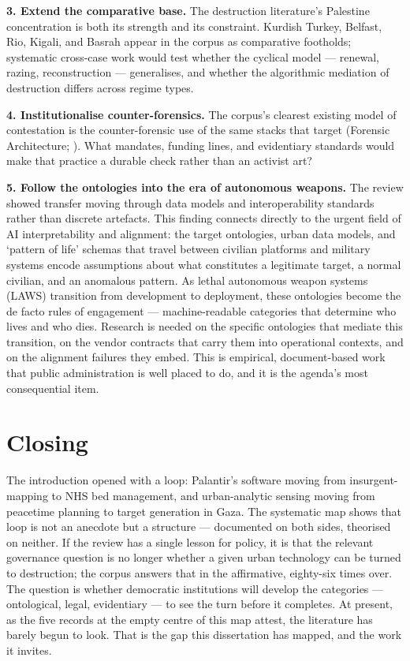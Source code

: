 \textbf{3. Extend the comparative base.} The destruction literature's Palestine concentration is both its strength and its constraint. Kurdish Turkey, Belfast, Rio, Kigali, and Basrah appear in the corpus as comparative footholds; systematic cross-case work would test whether the cyclical model — renewal, razing, reconstruction — generalises, and whether the algorithmic mediation of destruction differs across regime types.

\textbf{4. Institutionalise counter-forensics.} The corpus's clearest existing model of contestation is the counter-forensic use of the same stacks that target (Forensic Architecture; \cite{holail2024}). What mandates, funding lines, and evidentiary standards would make that practice a durable check rather than an activist art?

\textbf{5. Follow the ontologies into the era of autonomous weapons.} The review showed transfer moving through data models and interoperability standards rather than discrete artefacts. This finding connects directly to the urgent field of AI interpretability and alignment: the target ontologies, urban data models, and `pattern of life' schemas that travel between civilian platforms and military systems encode assumptions about what constitutes a legitimate target, a normal civilian, and an anomalous pattern. As lethal autonomous weapon systems (LAWS) transition from development to deployment, these ontologies become the de facto rules of engagement — machine-readable categories that determine who lives and who dies. Research is needed on the specific ontologies that mediate this transition, on the vendor contracts that carry them into operational contexts, and on the alignment failures they embed. This is empirical, document-based work that public administration is well placed to do, and it is the agenda's most consequential item.

\section{Closing}
\label{sec:closing}

The introduction opened with a loop: Palantir's software moving from insurgent-mapping to NHS bed management, and urban-analytic sensing moving from peacetime planning to target generation in Gaza. The systematic map shows that loop is not an anecdote but a structure — documented on both sides, theorised on neither. If the review has a single lesson for policy, it is that the relevant governance question is no longer whether a given urban technology can be turned to destruction; the corpus answers that in the affirmative, eighty-six times over. The question is whether democratic institutions will develop the categories — ontological, legal, evidentiary — to see the turn before it completes. At present, as the five records at the empty centre of this map attest, the literature has barely begun to look. That is the gap this dissertation has mapped, and the work it invites.
